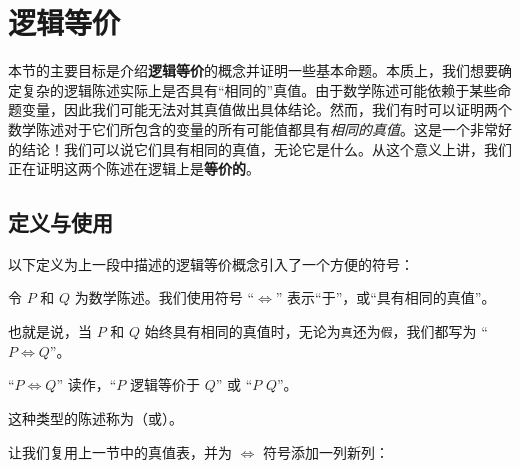 \section{逻辑等价}

本节的主要目标是介绍\textbf{逻辑等价}的概念并证明一些基本命题。本质上，我们想要确定复杂的逻辑陈述实际上是否具有``相同的''真值。由于数学陈述可能依赖于某些命题变量，因此我们可能无法对其真值做出具体结论。然而，我们有时可以证明两个数学陈述对于它们所包含的变量的所有可能值都具有\emph{相同的真值}。这是一个非常好的结论！我们可以说它们具有相同的真值，无论它是什么。从这个意义上讲，我们正在证明这两个陈述在逻辑上是\textbf{等价的}。

\subsection{定义与使用}\label{sec:section4.6.1}

以下定义为上一段中描述的逻辑等价概念引入了一个方便的符号：

\begin{definition}
    令 $P$ 和 $Q$ 为数学陈述。我们使用符号 ``$\iff$'' 表示``于''，或``具有相同的真值''。

    也就是说，当 $P$ 和 $Q$ 始终具有相同的真值时，无论为\verb|真|还为\verb|假|，我们都写为 ``$P \iff Q$''。

    ``$P \iff Q$'' 读作，``$P$ 逻辑等价于 $Q$'' 或 ``$P$  $Q$''。

    这种类型的陈述称为（或）。
\end{definition}

让我们复用上一节中的真值表，并为 $\iff$ 符号添加一列新列：

